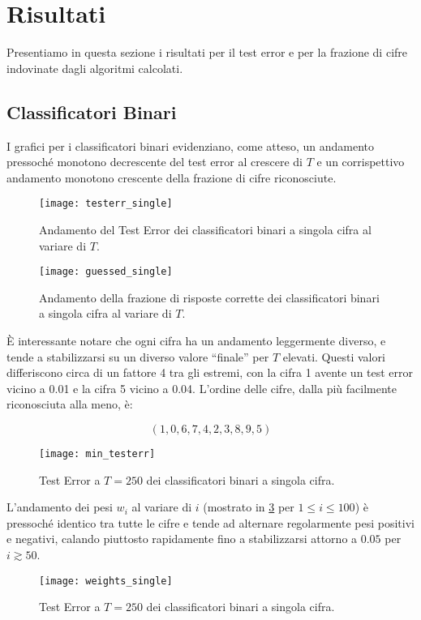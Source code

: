 
\section{Risultati}
Presentiamo in questa sezione i risultati per il test error e per la frazione di cifre indovinate dagli algoritmi calcolati.

\subsection{Classificatori Binari}

I grafici per i classificatori binari evidenziano, come atteso, un andamento pressoch\'e monotono decrescente del test error al crescere di $T$ e un corrispettivo andamento monotono crescente della frazione di cifre riconosciute.

\begin{figure}[H]
\centering
\texttt{[image: testerr\_single]}
\caption{Andamento del Test Error dei classificatori binari a singola cifra al variare di $T$.}

\texttt{[image: guessed\_single]}
\caption{Andamento della frazione di risposte corrette dei classificatori binari a singola cifra al variare di $T$.}
\label{fig:single}
\end{figure} 

\`E interessante notare che ogni cifra ha un andamento leggermente diverso, e tende a stabilizzarsi su un diverso valore ``finale'' per $T$ elevati. Questi valori differiscono circa di un fattore 4 tra gli estremi, con la cifra 1 avente un test error vicino a 0.01 e la cifra 5 vicino a 0.04. L'ordine delle cifre, dalla pi\`u facilmente riconosciuta alla meno, \`e:

\[(1, 0, 6, 7, 4, 2, 3, 8, 9, 5)\]

\begin{figure}[H]
\centering
\texttt{[image: min\_testerr]}
\caption{Test Error a \(T = 250\) dei classificatori binari a singola cifra.}
\label{fig:min_testerr}
\end{figure}

L'andamento dei pesi $w_i$ al variare di $i$ (mostrato in \ref{fig:weights_single} per \(1 \le i \le 100\)) \`e pressoch\'e identico tra tutte le cifre e tende ad alternare regolarmente pesi positivi e negativi, calando piuttosto rapidamente fino a stabilizzarsi attorno a $0.05$ per \(i \gtrsim 50\).

\begin{figure}[H]
\centering
\texttt{[image: weights\_single]}
\caption{Test Error a \(T = 250\) dei classificatori binari a singola cifra.}
\label{fig:weights_single}
\end{figure}

